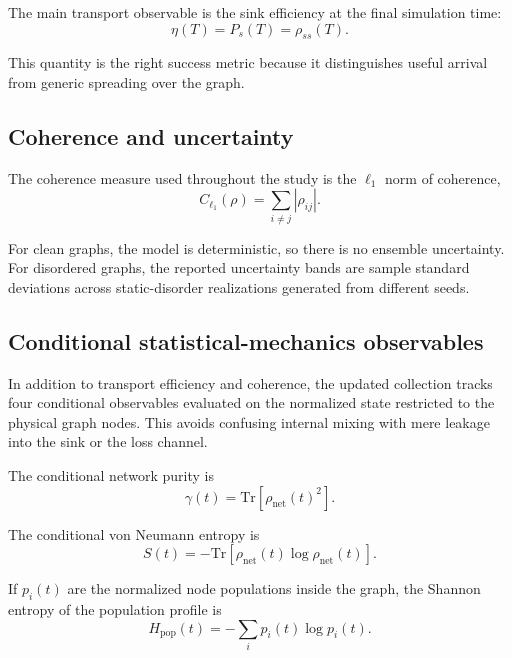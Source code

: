 \documentclass[11pt,a4paper]{article}
\newcommand{\abs}[1]{\left|#1\right|}
\begin{document}
The main transport observable is the sink efficiency at the final simulation time:
\begin{equation}
\eta(T)=P_s(T)=\rho_{ss}(T).
\end{equation}

This quantity is the right success metric because it distinguishes useful arrival
from generic spreading over the graph.

\subsection{Coherence and uncertainty}

The coherence measure used throughout the study is the $\ell_1$ norm of coherence,
\begin{equation}
C_{\ell_1}(\rho)=\sum_{i\neq j}\abs{\rho_{ij}}.
\end{equation}

For clean graphs, the model is deterministic, so there is no ensemble uncertainty.
For disordered graphs, the reported uncertainty bands are sample standard deviations
across static-disorder realizations generated from different seeds.

\subsection{Conditional statistical-mechanics observables}

In addition to transport efficiency and coherence, the updated collection tracks
four conditional observables evaluated on the normalized state restricted to the
physical graph nodes. This avoids confusing internal mixing with mere leakage
into the sink or the loss channel.

The conditional network purity is
\begin{equation}
\gamma(t)=\mathrm{Tr}\left[\rho_{\mathrm{net}}(t)^2\right].
\end{equation}

The conditional von Neumann entropy is
\begin{equation}
S(t)=-\mathrm{Tr}\left[\rho_{\mathrm{net}}(t)\log\rho_{\mathrm{net}}(t)\right].
\end{equation}

If $p_i(t)$ are the normalized node populations inside the graph, the Shannon
entropy of the population profile is
\begin{equation}
H_{\mathrm{pop}}(t)=-\sum_i p_i(t)\log p_i(t).
\end{equation}
\end{document}
